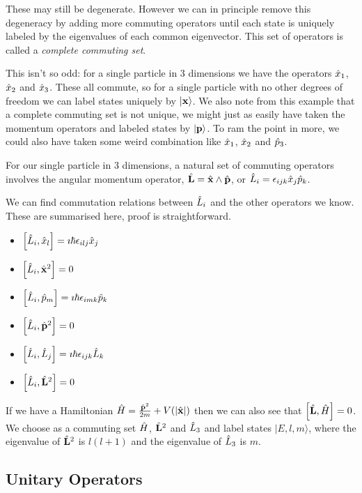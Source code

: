 \documentclass{notes}
\newcommand{\ket}[1]{|#1\rangle}
\newcommand{\com}[2]{\left[#1,#2\right]}
\begin{document}
These may still be degenerate.  However we can in principle remove this
degeneracy by adding more commuting operators until each state is uniquely
labeled by the eigenvalues of each common eigenvector.  This set of operators
is called a \emph{complete commuting set}.

This isn't so odd: for a single particle in 3 dimensions we have the
operators $\Hat{x}_1$, $\Hat{x}_2$ and $\Hat{x}_3$.  These all commute,
so for a single particle with no other degrees of freedom we can label
states uniquely by $\ket{\vect{x}}$.  We also note from this example that
a complete commuting set is not unique, we might just as easily have taken
the momentum operators and labeled states by $\ket{\vect{p}}$.  To ram
the point in more, we could also have taken some weird combination like
$\Hat{x}_1$, $\Hat{x}_2$ and $\Hat{p}_3$.

For our single particle in 3 dimensions, a natural set of commuting operators
involves the angular momentum operator, $\Hat{\mathbf{L}} = \Hat{\mathbf{x}} \wedge
\Hat{\mathbf{p}}$, or $\Hat{L}_i = \epsilon_{ijk} \Hat{x}_j \Hat{p}_k$.

We can find commutation relations between $\Hat{L}_i$ and the other operators
we know. These are summarised here, proof is straightforward.

\begin{itemize}
\item $\com{\Hat{L}_i}{\Hat{x}_l} = \imath \hbar \epsilon_{i l j} \Hat{x}_j$
\item $\com{\Hat{L}_i}{\Hat{\vect{x}}^2} = 0$
\item $\com{\Hat{L}_i}{\Hat{p}_m} = \imath \hbar \epsilon_{i m k} \Hat{p}_k$
\item $\com{\Hat{L}_i}{\Hat{\vect{p}}^2} = 0$
\item $\com{\Hat{L}_i}{\Hat{L}_j} = \imath \hbar \epsilon_{i j k} \Hat{L}_k$
\item $\com{\Hat{L}_i}{\Hat{\vect{L}}^2} = 0$
\end{itemize}

If we have a Hamiltonian $\Hat{H} = \frac{\Hat{\mathbf{p}}^2}{2 m} + V(\left|
\Hat{\mathbf{x}}\right|)$ then we can also see that $\com{\Hat{\vect{L}}}{\Hat{H}}
= 0$.
We choose as a commuting set $\Hat{H}$, $\Hat{\mathbf{L}}^2$ and $\Hat{L}_3$
and label states $\ket{E,l,m}$, where the eigenvalue of $\Hat{\mathbf{L}}^2$
is $l (l+1)$ and the eigenvalue of $\Hat{L}_3$ is $m$.

\subsection{Unitary Operators}
\end{document}
